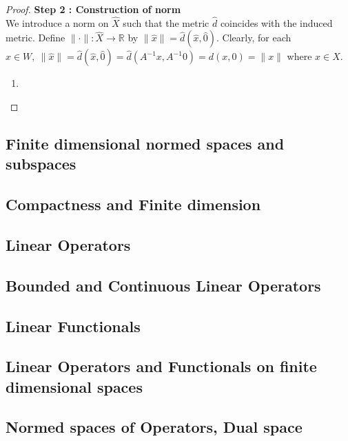 \begin{proof}
	\textbf{Step 2 : Construction of norm}\\

	We introduce a norm on $\hat{X}$ such that the metric $\hat{d}$ coincides with the induced metric.
	Define $\| \cdot \| : \hat{X} \to \mathbb{R}$ by $\| \hat{x} \| = \hat{d}(\hat{x},\hat{0})$.
	Clearly, for each $\hat{x} \in W,\ \| \hat{x} \| = \hat{d}(\hat{x},\hat{0}) = \hat{d}(A^{-1}x,A^{-1}0) = d(x,0) = \| x \|$ where $x \in X$.
	\begin{enumerate}
		\item 
	\end{enumerate}
\end{proof}

\subsection{Finite dimensional normed spaces and subspaces}
\subsection{Compactness and Finite dimension}
\subsection{Linear Operators}
\subsection{Bounded and Continuous Linear Operators}
\subsection{Linear Functionals}
\subsection{Linear Operators and Functionals on finite dimensional spaces}
\subsection{Normed spaces of Operators, Dual space}

